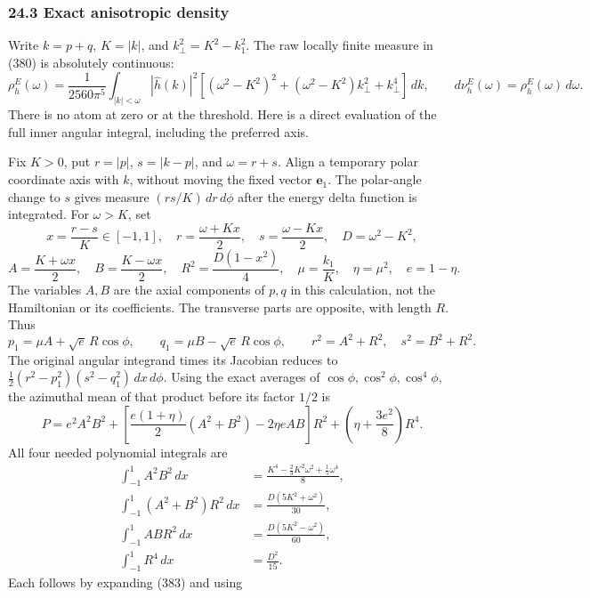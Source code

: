 \documentclass[
  11pt,
]{article}
\begin{document}
\subsubsection{24.3 Exact anisotropic
density}\label{exact-anisotropic-density}

Write \(k=p+q\), \(K=|k|\), and \(k_\perp^2=K^2-k_1^2\). The raw locally
finite measure in (380) is absolutely continuous: \[
 \boxed{
 \rho^E_h(\omega)=\frac1{2560\pi^5}
 \int_{|k|<\omega}|\widehat h(k)|^2
 \left[(\omega^2-K^2)^2+
       (\omega^2-K^2)k_\perp^2+k_\perp^4\right]\,dk,\qquad
 d\nu^E_h(\omega)=\rho^E_h(\omega)\,d\omega .
 }
 \tag{381}
\] There is no atom at zero or at the threshold. Here is a direct
evaluation of the full inner angular integral, including the preferred
axis.

Fix \(K>0\), put \(r=|p|\), \(s=|k-p|\), and \(\omega=r+s\). Align a
temporary polar coordinate axis with \(k\), without moving the fixed
vector \(\mathbf e_1\). The polar-angle change to \(s\) gives measure
\((rs/K)\,dr\,d\phi\) after the energy delta function is integrated. For
\(\omega>K\), set \[
 x=\frac{r-s}{K}\in[-1,1],\quad
 r=\frac{\omega+Kx}{2},\quad s=\frac{\omega-Kx}{2},
 \quad D=\omega^2-K^2,
 \tag{382}
\] \[
 A=\frac{K+\omega x}{2},\quad B=\frac{K-\omega x}{2},
 \quad R^2=\frac{D(1-x^2)}4,\quad
 \mu=\frac{k_1}{K},\quad \eta=\mu^2,\quad e=1-\eta.
 \tag{383}
\] The variables \(A,B\) are the axial components of \(p,q\) in this
calculation, not the Hamiltonian or its coefficients. The transverse
parts are opposite, with length \(R\). Thus \[
 p_1=\mu A+\sqrt e\,R\cos\phi,\qquad
 q_1=\mu B-\sqrt e\,R\cos\phi,\qquad
 r^2=A^2+R^2,\quad s^2=B^2+R^2.
 \tag{384}
\] The original angular integrand times its Jacobian reduces to
\(\tfrac12(r^2-p_1^2)(s^2-q_1^2)\,dx\,d\phi\). Using the exact averages
of \(\cos\phi,\cos^2\phi,\cos^4\phi\), the azimuthal mean of that
product before its factor \(1/2\) is \[
 P=e^2A^2B^2+
 \left[\frac{e(1+\eta)}2(A^2+B^2)-2\eta e AB\right]R^2
 +\left(\eta+\frac{3e^2}{8}\right)R^4.
 \tag{385}
\] All four needed polynomial integrals are \[
 \begin{split}
 \int_{-1}^1A^2B^2\,dx
  &=\frac{K^4-\frac23K^2\omega^2+\frac15\omega^4}{8},\\
 \int_{-1}^1(A^2+B^2)R^2\,dx
  &=\frac{D(5K^2+\omega^2)}{30},\\
 \int_{-1}^1ABR^2\,dx
  &=\frac{D(5K^2-\omega^2)}{60},\\
 \int_{-1}^1R^4\,dx&=\frac{D^2}{15}.
 \end{split}
 \tag{386}
\] Each follows by expanding (383) and using
\end{document}

